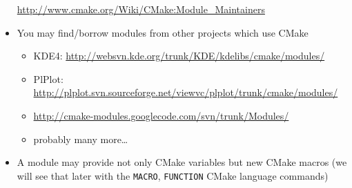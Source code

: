 \documentclass[compress,slidestop,table
              ]
               {beamer}
\begin{document}
\begin{frame}
\begin{itemize}
      \url{http://www.cmake.org/Wiki/CMake:Module_Maintainers}
\item You may find/borrow modules from other projects which use CMake
      \begin{itemize}
      \item KDE4: \url{http://websvn.kde.org/trunk/KDE/kdelibs/cmake/modules/}
      \item PlPlot: \url{http://plplot.svn.sourceforge.net/viewvc/plplot/trunk/cmake/modules/}
      \item \url{http://cmake-modules.googlecode.com/svn/trunk/Modules/}
      \item probably many more\ldots
      \end{itemize}
\item A module may provide not only CMake variables but new CMake macros
      (we will see that later with the \lstinline!MACRO!, \lstinline!FUNCTION!
       CMake language commands)
\end{itemize}
\end{frame}
\end{document}
